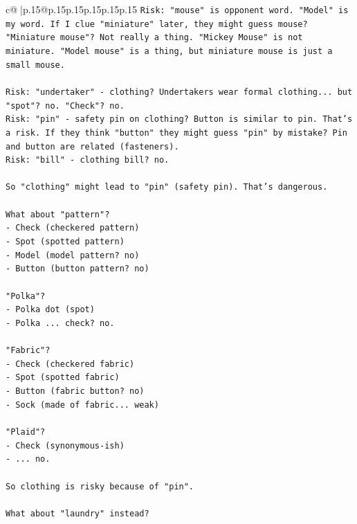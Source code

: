 \documentclass{article}
\begin{document}
{\begin{supertabular}{c@{$\;$}|p{.15\linewidth}@{}p{.15\linewidth}p{.15\linewidth}p{.15\linewidth}p{.15\linewidth}p{.15\linewidth}}
{{{\texttt{Risk: "mouse" is opponent word. "Model" is my word. If I clue "miniature" later, they might guess mouse? "Miniature mouse"? Not really a thing. "Mickey Mouse" is not miniature. "Model mouse" is a thing, but miniature mouse is just a small mouse.} \\
\\ 
\texttt{Risk: "undertaker" {-} clothing? Undertakers wear formal clothing... but "spot"? no. "Check"? no.} \\
\texttt{Risk: "pin" {-} safety pin on clothing? Button is similar to pin. That's a risk. If they think "button" they might guess "pin" by mistake? Pin and button are related (fasteners).} \\
\texttt{Risk: "bill" {-} clothing bill? no.} \\
\\ 
\texttt{So "clothing" might lead to "pin" (safety pin). That's dangerous.} \\
\\ 
\texttt{What about "pattern"?} \\
\texttt{{-} Check (checkered pattern)} \\
\texttt{{-} Spot (spotted pattern)} \\
\texttt{{-} Model (model pattern? no)} \\
\texttt{{-} Button (button pattern? no)} \\
\\ 
\texttt{"Polka"?} \\
\texttt{{-} Polka dot (spot)} \\
\texttt{{-} Polka ... check? no.} \\
\\ 
\texttt{"Fabric"?} \\
\texttt{{-} Check (checkered fabric)} \\
\texttt{{-} Spot (spotted fabric)} \\
\texttt{{-} Button (fabric button? no)} \\
\texttt{{-} Sock (made of fabric... weak)} \\
\\ 
\texttt{"Plaid"?} \\
\texttt{{-} Check (synonymous{-}ish)} \\
\texttt{{-} ... no.} \\
\\ 
\texttt{So clothing is risky because of "pin".} \\
\\ 
\texttt{What about "laundry" instead?} \\
}}}
\end{supertabular}}
\end{document}
